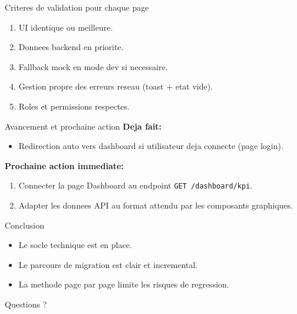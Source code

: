\documentclass[10pt,aspectratio=169]{beamer}
\begin{document}
\begin{frame}{Criteres de validation pour chaque page}
  \begin{enumerate}
    \item UI identique ou meilleure.
    \item Donnees backend en priorite.
    \item Fallback mock en mode dev si necessaire.
    \item Gestion propre des erreurs reseau (toast + etat vide).
    \item Roles et permissions respectes.
  \end{enumerate}
\end{frame}

\begin{frame}{Avancement et prochaine action}
  \textbf{Deja fait:}
  \begin{itemize}
    \item Redirection auto vers dashboard si utilisateur deja connecte (page login).
  \end{itemize}
  \vspace{0.3cm}
  \textbf{Prochaine action immediate:}
  \begin{enumerate}
    \item Connecter la page Dashboard au endpoint \texttt{GET /dashboard/kpi}.
    \item Adapter les donnees API au format attendu par les composants graphiques.
  \end{enumerate}
\end{frame}

\begin{frame}{Conclusion}
  \begin{itemize}
    \item Le socle technique est en place.
    \item Le parcours de migration est clair et incremental.
    \item La methode page par page limite les risques de regression.
  \end{itemize}
  \vspace{0.4cm}
  \centering
  \Large Questions ?
\end{frame}
\end{document}
